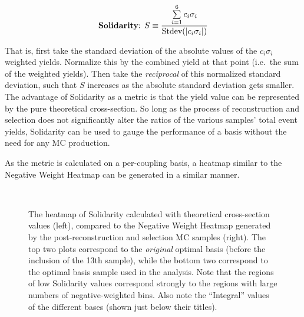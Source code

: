     \begin{equation}
    \textrm{\textbf{Solidarity}: }S \equiv \frac{ \sum\limits_{i=1}^6 c_i\sigma_i }{ \textrm{Stdev}(|c_i\sigma_i|) }
    \end{equation}

    That is, first take the standard deviation of the absolute values of the $c_i\sigma_i$ weighted yields.
    Normalize this by the combined yield at that point (i.e.\ the sum of the weighted yields).
    Then take the \textit{reciprocal} of this normalized standard deviation,
        such that $S$ increases as the absolute standard deviation gets smaller.
    The advantage of Solidarity as a metric
        is that the yield value can be represented by the pure theoretical cross-section.
    So long as the process of reconstruction and selection does not significantly alter the ratios of the various samples' total event yields,
        Solidarity can be used to gauge the performance of a basis without the need for any MC production.

    As the metric is calculated on a per-coupling basis,
        a heatmap similar to the Negative Weight Heatmap can be generated in a similar manner.

    \begin{figure}[tbh]
    	\centering
        \\
        \caption{
            The heatmap of Solidarity calculated with theoretical cross-section values (left),
                compared to the Negative Weight Heatmap generated by the post-reconstruction and selection MC samples (right).
            The top two plots correspond to the \textit{original} optimal basis (before the inclusion of the 13th sample),
                while the bottom two correspond to the optimal basis sample used in the analysis.
            Note that the regions of low Solidarity values correspond strongly to the regions with large numbers of negative-weighted bins.
            Also note the ``Integral'' values of the different bases (shown just below their titles).
        }
        \label{fig:solidarity_heatmaps}
    \end{figure}

